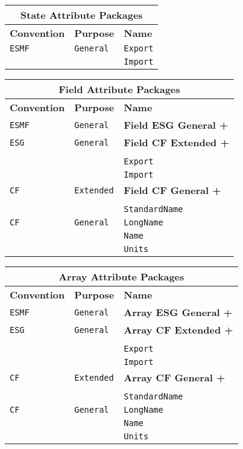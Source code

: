 \vspace{18pt}

\begin{tabular}{|p{4cm}|p{4cm}|p{6cm}|}
\hline
\multicolumn{3}{|c|}{{\bf \large State Attribute Packages}} \\
\hline\hline
{\bf Convention} & {\bf Purpose} & {\bf Name} \\
\hline\hline
{\tt ESMF} & {\tt General} & {\tt Export}  \\
 & & {\tt Import} \\ 
\hline
\end{tabular}
\label{StateAttributePackages}

\vspace{18pt}

\begin{tabular}{|p{4cm}|p{4cm}|p{6cm}|}
\hline
\multicolumn{3}{|c|}{{\bf \large Field Attribute Packages}} \\
\hline\hline
{\bf Convention} & {\bf Purpose} & {\bf Name} \\
\hline\hline
{\tt ESMF} & {\tt General} & {\bf Field ESG General +} \\
{\tt ESG} & {\tt General} & {\bf Field CF Extended +} \\
& & \\
& & {\tt Export}  \\
 & & {\tt Import} \\ 
\hline
{\tt CF} & {\tt Extended} & {\bf Field CF General +} \\
& & \\
& & {\tt StandardName}\\ 
\hline
{\tt CF} & {\tt General} & {\tt LongName}\\
     & & {\tt Name} \\
     & & {\tt Units}  \\
\hline
\end{tabular}
\label{FieldAttributePackages}

\begin{tabular}{|p{4cm}|p{4cm}|p{6cm}|}
\hline
\multicolumn{3}{|c|}{{\bf \large Array Attribute Packages}} \\
\hline\hline
{\bf Convention} & {\bf Purpose} & {\bf Name} \\
\hline\hline
{\tt ESMF} & {\tt General} & {\bf Array ESG General +} \\
{\tt ESG} & {\tt General} & {\bf Array CF Extended +} \\
& & \\
& & {\tt Export}  \\
 & & {\tt Import} \\ 
\hline
{\tt CF} & {\tt Extended} & {\bf Array CF General +} \\
& & \\
& & {\tt StandardName}\\ 
\hline
{\tt CF} & {\tt General} & {\tt LongName}\\
     & & {\tt Name} \\
     & & {\tt Units}  \\
\hline
\end{tabular}
\label{ArrayAttributePackages}

